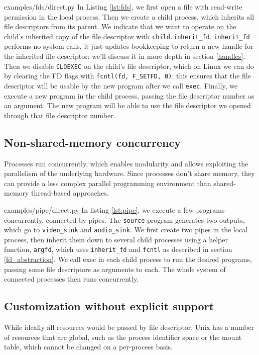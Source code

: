 \documentclass[letterpaper,twocolumn,10pt]{article}
\begin{document}

{examples/fds/direct.py}
In Listing \ref{lst:fds},
we first open a file with read-write permission in the local process.
Then we create a child process,
which inherits all file descriptors from its parent.
We indicate that we want to operate on the child's inherited copy of the file descriptor with \verb|child.inherit_fd|.
\texttt{inherit\_fd} performs no system calls,
it just updates bookkeeping to return a new handle for the inherited file descriptor;
we'll discuss it in more depth in section \ref{handles}.
Then we disable \texttt{CLOEXEC} on the child's file descriptor,
which on Linux we can do by clearing the FD flags with \verb|fcntl(fd, F_SETFD, 0)|;
this ensures that the file descriptor will be usable by the new program after we call \texttt{exec}.
Finally, we execute a new program in the child process,
passing the file descriptor number as an argument.
The new program will be able to use the file descriptor we opened through that file descriptor number.
\subsection{Non-shared-memory concurrency}
Processes run concurrently,
which enables modularity
and allows exploiting the parallelism of the underlying hardware.
Since processes don't share memory,
they can provide a less complex parallel programming environment
than shared-memory thread-based approaches.\cite{threads}


{examples/pipe/direct.py}
In listing \ref{lst:pipe},
we execute a few programs concurrently,
connected by pipes.
The \texttt{source} program generates two outputs, which go to \texttt{video\_sink} and \texttt{audio\_sink}.
We first create two pipes in the local process,
then inherit them down to several child processes using a helper function, \verb|argfd|,
which uses \verb|inherit_fd| and \texttt{fcntl} as described in section \ref{fd_abstraction}.
We call exec in each child process to run the desired programs,
passing some file descriptors as arguments to each.
The whole system of connected processes then runs concurrently.
\subsection{Customization without explicit support}
While ideally all resources would be passed by file descriptor,
Unix has a number of resources that are global,
such as the process identifier space or the mount table,
which cannot be changed on a per-process basis.\cite{capsicum}
\end{document}
